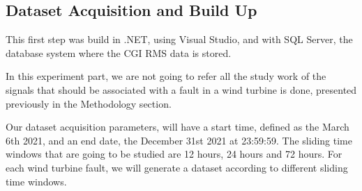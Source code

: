 \subsection{Dataset Acquisition and Build Up}
This first step was build in .NET, using Visual Studio, and with SQL Server, the database system where the CGI RMS data is stored.

In this experiment part, we are not going to refer all the study work of the signals that should be associated with a fault in a wind turbine is done, presented previously in the Methodology section.

Our dataset acquisition parameters, will have a start time, defined as the March 6th 2021, and an end date, the December 31st 2021 at 23:59:59. The sliding time windows that are going to be studied are 12 hours, 24 hours and 72 hours.
For each wind turbine fault, we will generate a dataset according to different sliding time windows.



